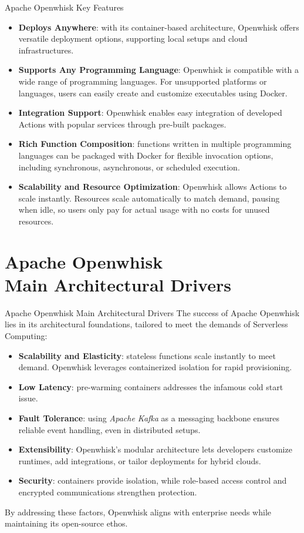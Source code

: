\documentclass[aspectratio=169]{beamer}
\begin{document}
\begin{frame}{Apache Openwhisk Key Features}
\begin{itemize}
    \item \textbf{Deploys Anywhere}: with its container-based architecture, Openwhisk offers versatile deployment options, supporting local setups and cloud infrastructures.
    \item \textbf{Supports Any Programming Language}: Openwhisk is compatible with a wide range of programming languages. For unsupported platforms or languages, users can easily create and customize executables using Docker.
    \item \textbf{Integration Support}: Openwhisk enables easy integration of developed Actions with popular services through pre-built packages.
    \item \textbf{Rich Function Composition}: functions written in multiple programming languages can be packaged with Docker for flexible invocation options, including synchronous, asynchronous, or scheduled execution.
    \item \textbf{Scalability and Resource Optimization}: Openwhisk allows Actions to scale instantly. Resources scale automatically to match demand, pausing when idle, so users only pay for actual usage with no costs for unused resources.
\end{itemize}
\end{frame}

\section{Apache Openwhisk \\Main Architectural Drivers}
\begin{frame}{Apache Openwhisk Main Architectural Drivers}
The success of Apache Openwhisk lies in its architectural foundations, tailored to meet the demands of Serverless Computing:
\begin{itemize}
    \item \textbf{Scalability and Elasticity}: stateless functions scale instantly to meet demand. Openwhisk leverages containerized isolation for rapid provisioning.
    \item \textbf{Low Latency}: pre-warming containers addresses the infamous cold start issue.
    \item \textbf{Fault Tolerance}: using \textit{Apache Kafka} as a messaging backbone ensures reliable event handling, even in distributed setups.
    \item \textbf{Extensibility}: Openwhisk’s modular architecture lets developers customize runtimes, add integrations, or tailor deployments for hybrid clouds.
    \item \textbf{Security}: containers provide isolation, while role-based access control and encrypted communications strengthen protection.
\end{itemize}
By addressing these factors, Openwhisk aligns with enterprise needs while maintaining its open-source ethos.
\end{frame}
\end{document}
